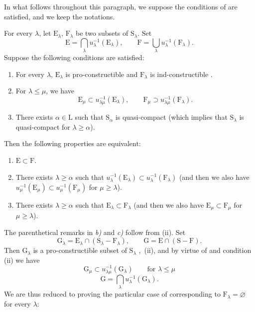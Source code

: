 \begin{env}[8.3.1]
\label{IV.8.3.1}
In what follows throughout this paragraph, we suppose the conditions of  are satisfied, and we keep the notations.
\end{env}

\begin{theorem}[8.3.2]
\label{IV.8.3.2}
For every $\lambda$, let $\mathrm{E}_\lambda$, $\mathrm{F}_\lambda$ be two subsets of $\mathrm{S}_\lambda$.
Set
\begin{equation}
  \mathrm{E}=\bigcap_\lambda u_\lambda^{-1}(\mathrm{E}_\lambda),\qquad \mathrm{F}=\bigcup_\lambda u_\lambda^{-1}(\mathrm{F}_\lambda).
  \tag{8.3.2.1}
\label{IV.8.3.2.1}
\end{equation}
Suppose the following conditions are satisfied:
\begin{enumerate}[label=(\roman*)]
  \item For every $\lambda$, $\mathrm{E}_\lambda$ is pro-constructible and $\mathrm{F}_\lambda$ is ind-constructible .
  \item For $\lambda\leqslant\mu$, we have
  \[
    \mathrm{E}_\mu\subset u_{\lambda\mu}^{-1}(\mathrm{E}_\lambda),\qquad \mathrm{F}_\mu\supset u_{\lambda\mu}^{-1}(\mathrm{F}_\lambda).
  \]
  \item There exists $\alpha\in\mathrm{L}$ such that $\mathrm{S}_\alpha$ is quasi-compact (which implies that $\mathrm{S}_\lambda$ is quasi-compact for $\lambda\geqslant\alpha$).
\end{enumerate}
Then the following properties are equivalent:
\begin{enumerate}[label=\emph{\alph*)}]
  \item $\mathrm{E}\subset\mathrm{F}$.
  \item There exists $\lambda\geqslant\alpha$ such that $u_\lambda^{-1}(\mathrm{E}_\lambda)\subset u_\lambda^{-1}(\mathrm{F}_\lambda)$ (and then we also have $u_\mu^{-1}(\mathrm{E}_\mu)\subset u_\mu^{-1}(\mathrm{F}_\mu)$ for
$\mu\geqslant\lambda$).
  \item There exists $\lambda\geqslant\alpha$ such that $\mathrm{E}_\lambda\subset\mathrm{F}_\lambda$ (and then we also have $\mathrm{E}_\mu\subset\mathrm{F}_\mu$ for $\mu\geqslant\lambda$).
\end{enumerate}
The parenthetical remarks in \emph{b)} and \emph{c)} follow from (ii).
Set
\[
  \mathrm{G}_\lambda=\mathrm{E}_\lambda\cap(\mathrm{S}_\lambda-\mathrm{F}_\lambda),\qquad \mathrm{G}=\mathrm{E}\cap(\mathrm{S}-\mathrm{F}).
\]
Then $\mathrm{G}_\lambda$ is a pro-constructible subset of $\mathrm{S}_\lambda$ ,~(ii), and by virtue of  and condition (ii) we have
\[
  \mathrm{G}_\mu\subset u_{\lambda\mu}^{-1}(\mathrm{G}_\lambda)\qquad\text{for }\lambda\leqslant\mu
\]
\[
  \mathrm{G}=\bigcap_\lambda u_\lambda^{-1}(\mathrm{G}_\lambda).
\]
We are thus reduced to proving the particular case of  corresponding to $\mathrm{F}_\lambda=\varnothing$ for every $\lambda$:
\end{theorem}

